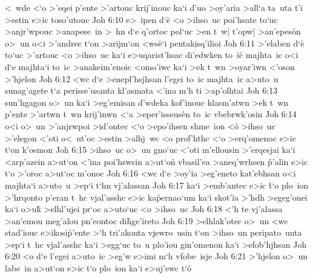 <~wde
<`o
>'eqei
p'ente
>'artouc
krij'inouc
ka`i
d'uo
>oy'aria
>all`a
ta~uta
t'i
>estin
e>ic
toso'utouc\bibvsend
\vs Joh 6:10
e>~ipen
d`e\r{}
<o
>ihso~uc
poi'hsate
to`uc
>anjr'wpouc
>anapese~in
>~hn
d`e
q'ortoc
pol`uc
>en
t~w|
t'opw|
>an'epes\r{o}n
o>~un
o<i
>'andrec
t`on
>arijm`on
<ws\r{e}`i
pentakisq'ilioi\bibvsend
\vs Joh 6:11
>'elaben
d`e\r{}
to`uc
>'artouc
<o
>ihso~uc
ka`i
e>uqarist'hsac
di'edwken
to~ic\r{}
majhta~ic
o<i
d`e
majhta`i
to~ic
>anakeim'enoic
<omo'iwc
ka`i
>ek
t~wn
>oyar'iwn
<'oson
>'hjelon\bibvsend
\vs Joh 6:12
<wc
d`e
>enepl'hsjhsan
l'egei
to~ic
majhta~ic
a>uto~u
sunag'agete
t`a
perisse'usanta
kl'asmata
<'ina
m'h
ti
>ap'olhtai\bibvsend
\vs Joh 6:13
sun'hgagon
o>~un
ka`i
>eg'emisan
d'wdeka
kof'inouc
klasm'atwn
>ek
t~wn
p'ente
>'artwn
t~wn
krij'inwn
<`a
>eper'isseus\r{e}n
to~ic
vbebrwk'osin\bibvsend
\vs Joh 6:14
o<i
o>~un
>'anjrwpoi
>id'ontec
<`o
>epo'ihsen
shme~ion
<o\r{}
>ihso~uc
>'elegon
<'oti
o<~ut'oc
>estin
>alhj~wc
<o
prof'hthc
<`o
>erq'omenoc
e>ic
t`on
k'osmon\bibvsend
\vs Joh 6:15
>ihso~uc
o>~un
gno`uc
<'oti
m'ellousin
>'erqesjai
ka`i
<arp'azein
a>ut`on
<'ina
poi'hswsin
a>ut`on\r{}
vbasil'ea
>aneq'wrhsen
\r{p}'alin
e>ic
t`o
>'oroc
a>ut`oc
m'onoc\bibvsend
\vs Joh 6:16
<wc
d`e
>oy'ia
>eg'eneto
kat'ebhsan
o<i
majhta`i
a>uto~u
>ep`i
t`hn
vj'alassan\bibvsend
\vs Joh 6:17
ka`i
>emb'antec
e>ic
\r{t}`o
plo~ion
>'hrqonto
p'eran
t~hc
vjal'asshc
e>ic
ka\r{p}ernao`um
ka`i
skot'ia
>'hdh
>egeg'onei
ka`i
o>u\r{k}
>elhl'ujei
pr`oc
a>uto`uc
<o
>ihso~uc\bibvsend
\vs Joh 6:18
<'h
te
vj'alassa
>an'emou
meg'alou
pn'eontoc
di\r{h}ge'ireto\bibvsend
{}
\vs Joh 6:19
>elhlak'otec
o>~un
<wc
stad'iouc
e>ikosi\r{p}'ente
>`h
tri'akonta
vjewro~usin
t`on
>ihso~un
peripato~unta
>ep`i
t~hc
vjal'asshc
ka`i
>egg`uc
to~u
plo'iou
gin'omenon
ka`i
>efob'hjhsan\bibvsend
\vs Joh 6:20
<o
d`e
l'egei
a>uto~ic
>eg'w
e>imi
m`h
vfobe~isje\bibvsend
\vs Joh 6:21
>'hjelon
o>~un
labe~in
a>ut`on
e>ic
t`o
plo~ion
ka`i
e>uj'ewc
t`o\r{}
